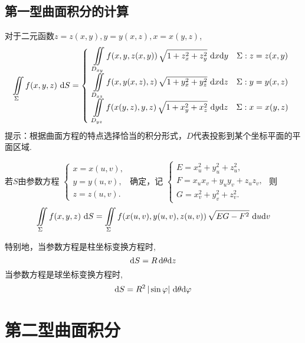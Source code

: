\subsection{第一型曲面积分的计算}
\ttheorem[二元函数下第一型曲面积分的计算]
对于二元函数$z=z(x,y),y=y(x,z),x=x(y,z)$,
\renewcommand\arraystretch{1.5}
\begin{equation}
	\iint\limits_{\Sigma}f(x,y,z)\,\,{\rm{d}} S 
	=
	\left\lbrace 
	\begin{array}{c}
		\displaystyle \iint\limits_{D_{xy}}f(x,y,z(x,y))\,\sqrt{1+z_x^2+z_y^2}\,\,{\rm{d}} x{\rm{d}} y\quad \Sigma :z=z(x,y) \\
		\displaystyle  \iint\limits_{D_{xz}}f(x,y(x,z),z)\,\sqrt{1+y_x^2+y_z^2}\,\,{\rm{d}} x{\rm{d}} z\quad \Sigma :y=y(x,z) \\
		\displaystyle  \iint\limits_{D_{yz}}f(x(y,z),y,z)\,\sqrt{1+x_y^2+x_z^2}\,\,{\rm{d}} y{\rm{d}} z\quad \Sigma :x=x(y,z)
	\end{array}
	\right.
\end{equation}
\renewcommand\arraystretch{1}
提示：根据曲面方程的特点选择恰当的积分形式，$D$代表投影到某个坐标平面的平面区域.

\theorem[参数方程下第一型曲面积分的计算]
若$S$由参数方程
$
\begin{cases}
	x = x(u,v),\\
	y = y(u,v),\\
	z= z(u,v).
\end{cases}
$
确定，记
$
\begin{cases}
	E = x_u^2 + y_u^2 +z_u^2,\\
	F = x_ux_v + y_uy_v + z_uz_v,\\
	G = x_v^2 + y_v^2 +z_v^2.
\end{cases}
$
则
\begin{equation}
	\iint\limits_{\Sigma}f(x,y,z)\,\,{\rm{d}} S =\iint\limits_{\Sigma}f(x(u,v),y(u,v),z(u,v))\,\sqrt{EG-F^2}\,\,{\rm{d}} u {\rm{d}} v
\end{equation}
\par 特别地，当参数方程是柱坐标变换方程时,
\begin{equation}
	{\rm{d}} S = R \,{\rm{d}} \theta {\rm{d}} z
\end{equation}
当参数方程是球坐标变换方程时,
\begin{equation}
	{\rm{d}} S = R^2\,|\sin \varphi| \,\,{\rm{d}} \theta {\rm{d}} \varphi
\end{equation}

\section{第二型曲面积分}
